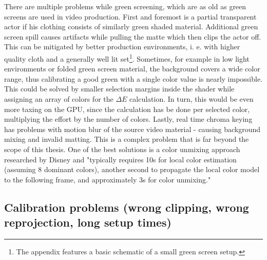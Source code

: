 There are multiple problems while green screening, which are as old as green 
screens are used in video production. First and foremost is a partial 
transparent actor if his clothing consists of similarly green shaded material.
\newline
Additional green screen spill causes artifacts while pulling the matte which 
then clips the actor off. This can be mitigated by better production 
environments, i. e. with higher quality cloth and a generally well lit 
set\footnote{The appendix features a basic schematic of a small green screen 
setup.}.
\newline
Sometimes, for example in low light environments or folded green screen 
material, the background covers a wide color range, thus calibrating a good 
green with a single color value is nearly impossible. This could be solved by 
smaller selection margins inside the shader while assigning an array of colors 
for the $\Delta E$ calculation. In turn, this would be even more taxing on the 
GPU, since the calculation has be done per selected color, multiplying the 
effort by the number of colors.
\newline
Lastly, real time chroma keying has problems with motion blur of the source 
video material - causing background mixing and invalid matting. This is a 
complex problem that is far beyond the scope of this thesis. One of the best 
solutions is a color unmixing approach researched by Disney and "typically 
requires 10s for local color estimation (assuming 8 dominant colors), another 
second to propagate the local color model to the following frame, and 
approximately 3s for color unmixing." \cite{disney:unmixing:2017}

\subsection{Calibration problems (wrong clipping, wrong reprojection, long 
setup times)}

